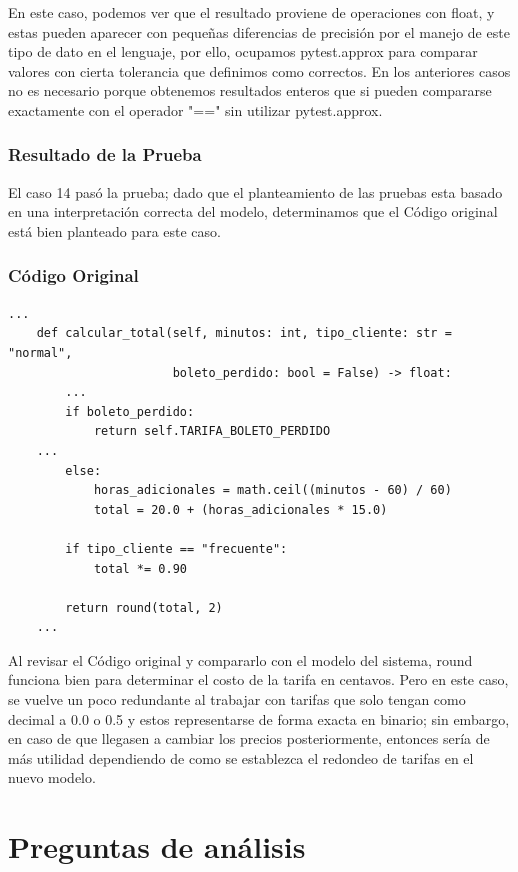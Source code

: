 \documentclass[11pt,letterpaper]{article}
\begin{document}
En este caso, podemos ver que el resultado proviene de operaciones con float, y estas pueden aparecer con pequeñas diferencias de precisión por el manejo de este tipo de dato en el lenguaje, por ello, ocupamos pytest.approx para comparar valores con cierta tolerancia que definimos como correctos. En los anteriores casos no es necesario porque obtenemos resultados enteros que si pueden compararse exactamente con el operador "==" sin utilizar pytest.approx.
\subsubsection{Resultado de la Prueba}
\label{sec:orgebb703b}

El caso 14 pasó la prueba; dado que el planteamiento de las pruebas esta basado en una interpretación correcta del modelo, determinamos que el Código original está bien planteado para este caso.
\subsubsection{Código Original}
\label{sec:org693c062}


\begin{lstlisting}[style=practica]
    ...
    def calcular_total(self, minutos: int, tipo_cliente: str = "normal",
                       boleto_perdido: bool = False) -> float:
        ...
        if boleto_perdido:
            return self.TARIFA_BOLETO_PERDIDO
	...
        else:
            horas_adicionales = math.ceil((minutos - 60) / 60)
            total = 20.0 + (horas_adicionales * 15.0)
	    
        if tipo_cliente == "frecuente":
            total *= 0.90

        return round(total, 2)
    ...
\end{lstlisting}

Al revisar el Código original y compararlo con el modelo del sistema, round funciona bien para determinar el costo de la tarifa en centavos. Pero en este caso, se vuelve un poco redundante al trabajar con tarifas que solo tengan como decimal a 0.0 o 0.5 y estos representarse de forma exacta en binario; sin embargo, en caso de que llegasen a cambiar los precios posteriormente, entonces sería de más utilidad dependiendo de como se establezca el redondeo de tarifas en el nuevo modelo.
\section{Preguntas de análisis}
\label{sec:org2056374}
\end{document}
